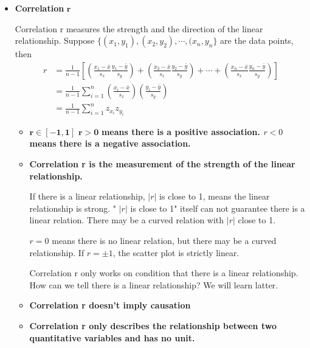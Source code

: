 \documentclass[a4paper, 12pt,twoside]{book}
\begin{document}
\begin{itemize}
\vspace{1cm}

 \item \textbf{Correlation} $\mathbf{r}$
 \vspace{0.6cm}
 
 Correlation r measures the strength and the direction of the linear relationship. Suppose $\{(x_1, y_1), (x_2, y_2), \cdots, (x_n, y_n\}$ are the data points, then
 \begin{equation*}
 \begin{split}
 r&=\frac{1}{n-1}[(\frac{x_1-\bar{x}}{s_x}\frac{y_1-\bar{y}}{s_y}) + (\frac{x_2-\bar{x}}{s_x}\frac{y_2-\bar{y}}{s_y})+\cdots + (\frac{x_n-\bar{x}}{s_x}\frac{y_n-\bar{y}}{s_y})]\\
 &= \frac{1}{n-1}\sum_{i=1}^n(\frac{x_i-\bar{x}}{s_x})(\frac{y_i-\bar{y}}{s_y})\\
 &= \frac{1}{n-1}\sum_{i=1}^n z_{x_i}z_{y_i}
 \end{split} 
 \end{equation*}
 
 \begin{itemize}
  \item $\mathbf{r\in [-1, 1]}$
  $\mathbf{r>0}$ \textbf{means there is a positive association. $r<0$ means there is a negative association.}
  \vspace{0.6cm}
  
  \item \textbf{Correlation r is the measurement of the strength of the linear relationship.}
  \vspace{0.6cm}
  
  If there is a linear relationship, $|r|$ is close to 1, means the linear relationship is strong. " $|r|$ is close to 1" itself can not guarantee there is a linear relation. There may be a curved relation with $|r|$ close to 1.
  \vspace{0.6cm}
  
  $r = 0$ means there is no linear relation, but there may be a curved relationship. If  $r = \pm 1$, the scatter plot is strictly linear.
  \vspace{0.6cm}
  
  Correlation r only works on condition that there is a linear relationship. How can we tell there is a linear relationship? We will learn latter.
   \vspace{0.6cm}
   
 \item \textbf{Correlation r doesn't imply causation}
 \vspace{0.6cm}
 
 \item \textbf{Correlation r only describes the relationship between two quantitative variables and has no unit.}   
 \end{itemize} 
\end{itemize}
\end{document}
